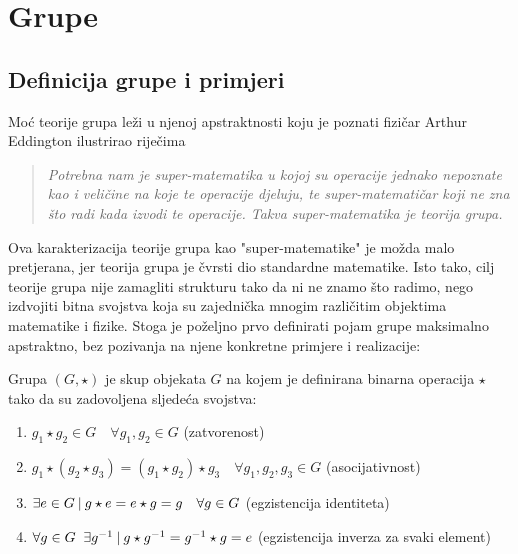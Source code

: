 
\chapter{Grupe}

\section{Definicija grupe i primjeri}


Moć teorije grupa leži u njenoj apstraktnosti koju je poznati fizičar Arthur
Eddington  ilustrirao riječima
\begin{quote}
\emph{Potrebna nam je super-matematika u kojoj su operacije jednako nepoznate kao i
veličine na koje te operacije djeluju, te super-matematičar koji ne zna što radi kada
izvodi te operacije. Takva super-matematika je teorija grupa.}
\end{quote}
Ova karakterizacija teorije grupa kao "super-matematike" je možda malo pretjerana, jer
teorija grupa je čvrsti dio standardne matematike.
Isto tako, cilj teorije grupa nije zamagliti strukturu
tako da ni ne znamo što radimo, nego izdvojiti bitna svojstva koja su zajednička
mnogim različitim objektima matematike i fizike.
Stoga je poželjno prvo definirati pojam grupe maksimalno apstraktno, bez pozivanja
na njene konkretne primjere i realizacije:

\begin{definicija}[Grupa]
    \label{def:grupa}  
Grupa $(G,\star)$ je skup objekata $G$ na kojem je definirana binarna operacija
 $\star$ tako da su zadovoljena sljedeća svojstva:
\begin{enumerate}
\item $g_1 \star g_2 \in G \quad \forall  g_1, g_2 \in G$  (zatvorenost) 
\item $ g_1 \star (g_2 \star g_3) = (g_1 \star  g_2)\star g_3 \quad \forall 
    g_1, g_2, g_3 \in G$  (asocijativnost) 
\item $\exists e \in G \: | \: g\star e = e \star g = g \quad \forall g\in G$
    (egzistencija identiteta) 
\item $\forall g\in G \;\; \exists g^{-1} \: | \: g\star g^{-1} = g^{-1}\star g =e$
    (egzistencija inverza za svaki element) 
\end{enumerate}
\end{definicija}

